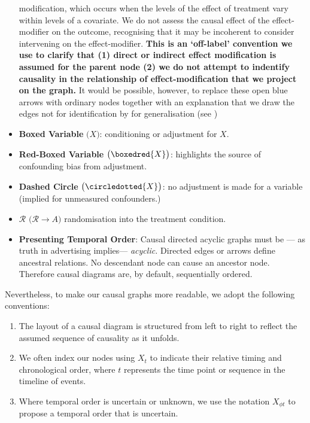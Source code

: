 \documentclass[
  single column]{article}
\providecommand{\tightlist}{%
  \setlength{\itemsep}{0pt}\setlength{\parskip}{0pt}}\usepackage{longtable,booktabs,array}
\begin{document}
\begin{itemize}
  modification, which occurs when the levels of the effect of treatment
  vary within levels of a covariate. We do not assess the causal effect
  of the effect-modifier on the outcome, recognising that it may be
  incoherent to consider intervening on the effect-modifier.
  \textbf{This is an `off-label' convention we use to clarify that (1)
  direct or indirect effect modification is assumed for the parent node
  (2) we do not attempt to indentify causality in the relationship of
  effect-modification that we project on the graph.} It would be
  possible, however, to replace these open blue arrows with ordinary
  nodes together with an explanation that we draw the edges not for
  identification by for generalisation (see
  )
\item
  \textbf{Boxed Variable} \(\big(\boxed{X}\big)\): conditioning or
  adjustment for \(X\).
\item
  \textbf{Red-Boxed Variable} \(\big(\boxedred{X}\big)\): highlights the
  source of confounding bias from adjustment.
\item
  \textbf{Dashed Circle} \(\big( \circledotted{X}\big)\): no adjustment
  is made for a variable (implied for unmeasured confounders.)
\item
  \textbf{\(\mathbf{\mathcal{R}}\)}
  \(\big(\mathcal{R} \rightarrow A\big)\) randomisation into the
  treatment condition.
\item
  \textbf{Presenting Temporal Order}: Causal directed acyclic graphs
  must be --- as truth in advertising implies--- \emph{acyclic.}
  Directed edges or arrows define ancestral relations. No descendant
  node can cause an ancestor node. Therefore causal diagrams are, by
  default, sequentially ordered.
\end{itemize}

Nevertheless, to make our causal graphs more readable, we adopt the
following conventions:

\begin{enumerate}
\def\labelenumi{\arabic{enumi}.}
\tightlist
\item
  The layout of a causal diagram is structured from left to right to
  reflect the assumed sequence of causality as it unfolds.
\item
  We often index our nodes using \(X_t\) to indicate their relative
  timing and chronological order, where \(t\) represents the time point
  or sequence in the timeline of events.
\item
  Where temporal order is uncertain or unknown, we use the notation
  \(X_{\phi t}\) to propose a temporal order that is uncertain.
\end{enumerate}
\end{document}

